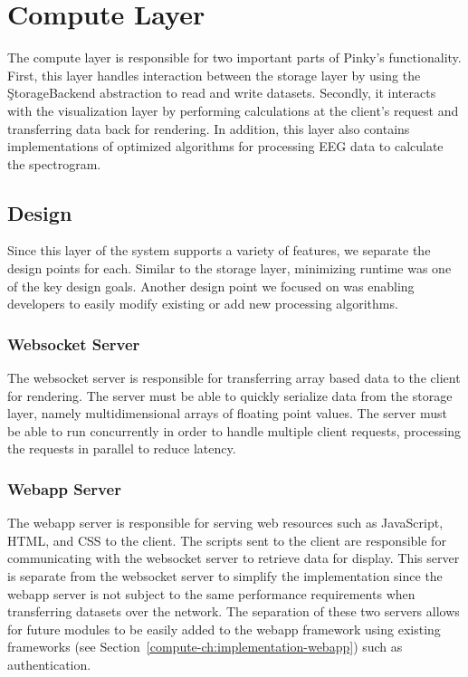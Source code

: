 \chapter{Compute Layer}\label{compute-ch}

The compute layer is responsible for two important parts of Pinky's
functionality. First, this layer handles interaction between the storage layer
by using the \c{StorageBackend} abstraction to read and write datasets.
Secondly, it interacts with the visualization layer by performing calculations
at the client's request and transferring data back for rendering. In addition,
this layer also contains implementations of optimized algorithms for processing
EEG data to calculate the spectrogram.

\section{Design}

Since this layer of the system supports a variety of features, we separate the
design points for each. Similar to the storage layer, minimizing runtime was
one of the key design goals. Another design point we focused on was enabling
developers to easily modify existing or add new processing algorithms.

\subsection{Websocket Server}

The websocket server is responsible for transferring array based data to the
client for rendering. The server must be able to quickly serialize data from
the storage layer, namely multidimensional arrays of floating point values. The
server must be able to run concurrently in order to handle multiple client
requests, processing the requests in parallel to reduce latency.

\subsection{Webapp Server}

The webapp server is responsible for serving web resources such as JavaScript,
HTML, and CSS to the client. The scripts sent to the client are responsible for
communicating with the websocket server to retrieve data for display. This
server is separate from the websocket server to simplify the implementation
since the webapp server is not subject to the same performance requirements
when transferring datasets over the network. The separation of these two
servers allows for future modules to be easily added to the webapp framework
using existing frameworks (see Section~\ref{compute-ch:implementation-webapp})
such as authentication.

